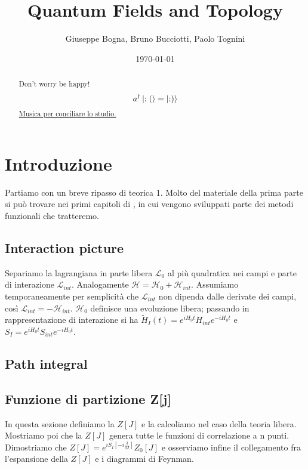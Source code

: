 \documentclass[a4paper, 11pt]{article}
\date{\today}
\author{Giuseppe Bogna, Bruno Bucciotti, Paolo Tognini}
\title{Quantum Fields and Topology}
\begin{document}
	\maketitle
	
	\begin{abstract}
		Don't worry be happy!\\
		\[a^\dagger \left| :(\right\rangle = \left| :)\right\rangle\]
		\href{https://www.youtube.com/watch?v=quYjN57Tycg}{Musica per conciliare lo studio.}
	\end{abstract}

	\tableofcontents
	\clearpage
	
	\section{Introduzione}
	
	Partiamo con un breve ripasso di teorica 1. Molto del materiale della prima parte si può trovare nei primi capitoli di \cite{anselmi}, in cui vengono sviluppati parte dei metodi funzionali che tratteremo.
	
	\subsection{Interaction picture}
	Separiamo la lagrangiana in parte libera $\mathcal{L}_0$ al più quadratica nei campi e parte di interazione $\mathcal{L}_{int}$. Analogamente $\mathcal{H} = \mathcal{H}_0+\mathcal{H}_{int}$. Assumiamo temporaneamente per semplicità che $\mathcal{L}_{int}$ non dipenda dalle derivate dei campi, così $\mathcal{L}_{int} = -\mathcal{H}_{int}$. $\mathcal{H}_0$ definisce una evoluzione libera; passando in rappresentazione di interazione si ha $\tilde{H}_I(t) = e^{iH_0t}H_{int}e^{-iH_0t}$ e $S_I = e^{iH_0t}S_{int}e^{-iH_0t}$.
	
	\subsection{Path integral}
	
	
	\subsection{Funzione di partizione Z[j]}
	In questa sezione definiamo la $Z[J]$ e la calcoliamo nel caso della teoria libera. Mostriamo poi che la $Z[J]$ genera tutte le funzioni di correlazione a n punti. Dimostriamo che $Z[J] = e^{iS_I[-i\frac{\delta}{\delta J}]} Z_0[J]$ e osserviamo infine il collegamento fra l'espansione della $Z[J]$ e i diagrammi di Feynman.
	
\end{document}
